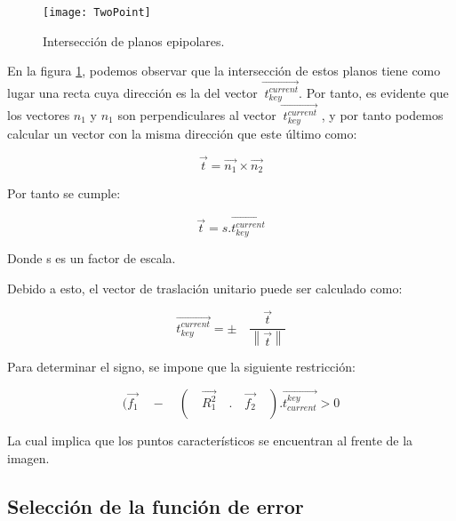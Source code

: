 \begin{figure}[H]
	\centering
	\texttt{[image: TwoPoint]}
	\caption[Intersección de planos epipolares]{Intersección de planos epipolares.}
	\label{imagen:epipolarPlanes}
\end{figure}


En la figura \ref{imagen:epipolarPlanes}, podemos observar que la intersección de estos planos tiene como lugar una recta cuya dirección es la del vector  $\overset { \rightarrow  }{ { \ t }_{ key }^{ current } } $. Por tanto, es evidente que los vectores ${n}_{1}$ y ${n}_{1}$ son perpendiculares al vector $\overset { \rightarrow  }{ { \ t }_{ key }^{ current } }  $ , y por tanto podemos calcular un vector con la misma dirección que este último como:


\begin{equation}
\overset { \rightarrow  }{ { t } } =\overset { \rightarrow  }{ { { n }_{ 1 } } } \times \overset { \rightarrow  }{ { { n }_{ 2 } } } 
\end{equation}

Por tanto se cumple:

\begin{equation}
 \overset { \rightarrow  }{ { t } } = s.\overset { \rightarrow  }{ {t }_{ key }^{ current } } 
\end{equation}

Donde s es un factor de escala.

Debido a esto, el vector de traslación unitario puede ser calculado como:

\begin{equation}
\overset { \rightarrow  }{ { t }_{ key}^{ current } } =\pm \quad \frac { \overset { \rightarrow  }{ t }  }{ \left\| \overset { \rightarrow  }{ t }  \right\|  } 
\end{equation}

Para determinar el signo, se  impone que la siguiente restricción:

\begin{equation}
(\overset { \rightarrow  }{ { f }_{ 1 } } \quad -\quad (\quad \overset { \rightarrow  }{ { { R }_{ 1 }^{ 2 } } } \quad .\quad \overset { \rightarrow  }{ { f }_{ 2 } } \quad ).\overset { \rightarrow  }{ { t }_{ current }^{ key } } >0
\end{equation}

La cual implica que los puntos característicos se encuentran al frente de la imagen.



\subsection{Selección de la función de error }

